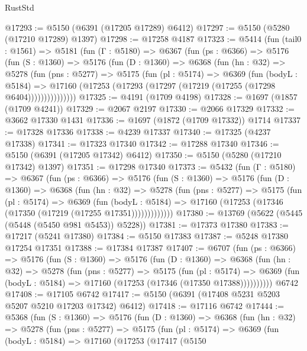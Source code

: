 \begin{lexlean}{RustStd}
\begin{coremodule}
@17293 := @5150 (@6391 (@17205 @17289) @6412)
@17297 := @5150 (@5280 (@17210 @17289) @1397)
@17298 := @17258 @4187
@17323 := @5414
    (fun (tail0 : @1561) =>
    @5181
      (fun (Γ : @5180) =>
      @6367
        (fun (ps : @6366) =>
        @5176
          (fun (S : @1360) =>
          @5176
            (fun (D : @1360) =>
            @6368
              (fun (hn : @32) =>
              @5278
                (fun (pns : @5277) =>
                @5175
                  (fun (pl : @5174) =>
                  @6369
                    (fun (bodyL : @5184) =>
                    @17160 (@17253 (@17293 (@17297 (@17219 (@17255 (@17298 @6404)))))))))))))))
@17325 := @4191 (@1709 @4198)
@17328 := @1697 (@1857 (@1709 @4241))
@17329 := @2067 @2197
@17330 := @2066 @17329
@17332 := @3662 @17330 @1431
@17336 := @1697 (@1872 (@1709 @17332)) @1714
@17337 := @17328 @17336
@17338 := @4239 @17337
@17340 := @17325 (@4237 @17338)
@17341 := @17323 @17340
@17342 := @17288 @17340
@17346 := @5150 (@6391 (@17205 @17342) @6412)
@17350 := @5150 (@5280 (@17210 @17342) @1397)
@17351 := @17298 @17340
@17373 := @5432
    (fun (Γ : @5180) =>
    @6367
      (fun (ps : @6366) =>
      @5176
        (fun (S : @1360) =>
        @5176
          (fun (D : @1360) =>
          @6368
            (fun (hn : @32) =>
            @5278
              (fun (pns : @5277) =>
              @5175
                (fun (pl : @5174) =>
                @6369
                  (fun (bodyL : @5184) =>
                  @17160 (@17253 (@17346 (@17350 (@17219 (@17255 @17351)))))))))))))
@17380 := @13769 (@5622 (@5445 (@5448 (@5450 @981 @5453)) @5228))
@17381 := @17373 @17380
@17383 := @17217 (@5241 @17380)
@17384 := @5150 @17383
@17387 := @5248 @17380 @17254 @17351
@17388 := @17384 @17387
@17407 := @6707
    (fun (ps : @6366) =>
    @5176
      (fun (S : @1360) =>
      @5176
        (fun (D : @1360) =>
        @6368
          (fun (hn : @32) =>
          @5278
            (fun (pns : @5277) =>
            @5175
              (fun (pl : @5174) =>
              @6369 (fun (bodyL : @5184) => @17160 (@17253 (@17346 (@17350 @17388))))))))))
    @6742
@17408 := @17105 @6742
@17417 := @5150 (@6391 (@17408 @5231 @5203 @5207 @5210 @17203 @17342) @6412)
@17418 := @17116 @6742
@17444 := @5368
    (fun (S : @1360) =>
    @5176
      (fun (D : @1360) =>
      @6368
        (fun (hn : @32) =>
        @5278
          (fun (pns : @5277) =>
          @5175
            (fun (pl : @5174) =>
            @6369
              (fun (bodyL : @5184) =>
              @17160
                (@17253
                  (@17417
                    (@5150

\end{coremodule}
\end{lexlean}
